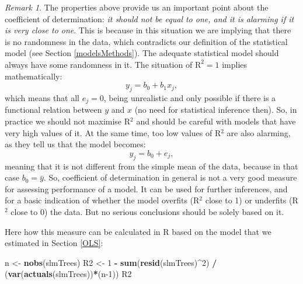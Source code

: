 \documentclass[
]{book}
\newenvironment{Shaded}{\begin{snugshade}}{\end{snugshade}}
\newcommand{\DecValTok}[1]{\textcolor[rgb]{0.00,0.00,0.81}{#1}}
\newcommand{\FunctionTok}[1]{\textcolor[rgb]{0.13,0.29,0.53}{\textbf{#1}}}
\newcommand{\NormalTok}[1]{#1}
\newcommand{\OtherTok}[1]{\textcolor[rgb]{0.56,0.35,0.01}{#1}}
\newcommand{\SpecialCharTok}[1]{\textcolor[rgb]{0.81,0.36,0.00}{\textbf{#1}}}
\theoremstyle{definition}
\theoremstyle{definition}
\theoremstyle{definition}
\theoremstyle{definition}
\theoremstyle{remark}
\newtheorem*{remark}{Remark}
\begin{document}
\begin{remark}
The properties above provide us an important point about the coefficient of determination: \emph{it should not be equal to one, and it is alarming if it is very close to one}. This is because in this situation we are implying that there is no randomness in the data, which contradicts our definition of the statistical model (see Section \ref{modelsMethods}). The adequate statistical model should always have some randomness in it. The situation of \(\mathrm{R}^2=1\) implies mathematically:
\begin{equation*}
    y_j = b_0 + b_1 x_j ,
\end{equation*}
which means that all \(e_j=0\), being unrealistic and only possible if there is a functional relation between \(y\) and \(x\) (no need for statistical inference then). So, in practice we should not maximise R\(^2\) and should be careful with models that have very high values of it. At the same time, too low values of R\(^2\) are also alarming, as they tell us that the model becomes:
\begin{equation*}
    y_j = b_0 + e_j,
\end{equation*}
meaning that it is not different from the simple mean of the data, because in that case \(b_0=\bar{y}\). So, coefficient of determination in general is not a very good measure for assessing performance of a model. It can be used for further inferences, and for a basic indication of whether the model overfits (R\(^2\) close to 1) or underfits (R\(^2\) close to 0) the data. But no serious conclusions should be solely based on it.
\end{remark}

Here how this measure can be calculated in R based on the model that we estimated in Section \ref{OLS}:

\begin{Shaded}
\begin{Highlighting}[]
\NormalTok{n }\OtherTok{\textless{}{-}} \FunctionTok{nobs}\NormalTok{(slmTrees)}
\NormalTok{R2 }\OtherTok{\textless{}{-}} \DecValTok{1} \SpecialCharTok{{-}} \FunctionTok{sum}\NormalTok{(}\FunctionTok{resid}\NormalTok{(slmTrees)}\SpecialCharTok{\^{}}\DecValTok{2}\NormalTok{) }\SpecialCharTok{/}\NormalTok{ (}\FunctionTok{var}\NormalTok{(}\FunctionTok{actuals}\NormalTok{(slmTrees))}\SpecialCharTok{*}\NormalTok{(n}\DecValTok{{-}1}\NormalTok{))}
\NormalTok{R2}
\end{Highlighting}
\end{Shaded}
\end{document}
